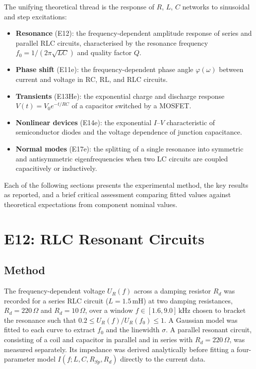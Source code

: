 \documentclass[a4paper, 10pt]{article}
\newcommand{\kHz}{\si{\kilo\hertz}}
\newcommand{\mH}{\si{\milli\henry}}
\begin{document}
The unifying theoretical thread is the response of $R$, $L$, $C$ networks to
sinusoidal and step excitations:
\begin{itemize}[itemsep=2pt]
  \item \textbf{Resonance} (E12): the frequency-dependent amplitude response
        of series and parallel RLC circuits, characterised by the resonance
        frequency $f_0 = 1/(2\pi\sqrt{LC})$ and quality factor $Q$.
  \item \textbf{Phase shift} (E11e): the frequency-dependent phase angle
        $\varphi(\omega)$ between current and voltage in RC, RL, and RLC
        circuits.
  \item \textbf{Transients} (E13He): the exponential charge and discharge
        response $V(t) = V_0 e^{-t/RC}$ of a capacitor switched by a MOSFET.
  \item \textbf{Nonlinear devices} (E14e): the exponential $I$--$V$
        characteristic of semiconductor diodes and the voltage dependence of
        junction capacitance.
  \item \textbf{Normal modes} (E17e): the splitting of a single resonance
        into symmetric and antisymmetric eigenfrequencies when two LC
        circuits are coupled capacitively or inductively.
\end{itemize}

Each of the following sections presents the experimental method, the key
results as reported, and a brief critical assessment comparing fitted
values against theoretical expectations from component nominal values.

\section{E12: RLC Resonant Circuits}

\subsection{Method}

The frequency-dependent voltage $U_R(f)$ across a damping resistor $R_d$ was
recorded for a series RLC circuit ($L = 1.5\,\mH$) at two damping
resistances, $R_d = 220\,\Omega$ and $R_d = 10\,\Omega$, over a window
$f \in [1.6, 9.0]\,\kHz$ chosen to bracket the resonance such that
$0.2 \le U_R(f)/U_R(f_0) \le 1$. A Gaussian model was fitted to each curve to
extract $f_0$ and the linewidth $\sigma$. A parallel resonant circuit,
consisting of a coil and capacitor in parallel and in series with
$R_d = 220\,\Omega$, was measured separately. Its impedance was derived
analytically before fitting a four-parameter model $I(f; L, C, R_{Sp}, R_d)$
directly to the current data.
\end{document}
